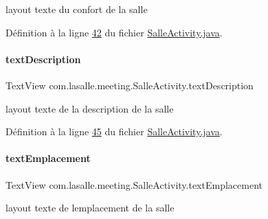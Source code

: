 layout texte du confort de la salle 



Définition à la ligne \hyperlink{_salle_activity_8java_source_l00042}{42} du fichier \hyperlink{_salle_activity_8java_source}{Salle\+Activity.\+java}.

\mbox{\label{classcom_1_1lasalle_1_1meeting_1_1_salle_activity_acc3b8d915861076b132cdc33f4d9f298}} 
\paragraph{\texorpdfstring{text\+Description}{textDescription}}
{\footnotesize\ttfamily Text\+View com.\+lasalle.\+meeting.\+Salle\+Activity.\+text\+Description\hspace{0.3cm}{\ttfamily [private]}}



layout texte de la description de la salle 



Définition à la ligne \hyperlink{_salle_activity_8java_source_l00045}{45} du fichier \hyperlink{_salle_activity_8java_source}{Salle\+Activity.\+java}.

\mbox{\label{classcom_1_1lasalle_1_1meeting_1_1_salle_activity_a3e7b6e7c522546e84409d3b658985ca8}} 
\paragraph{\texorpdfstring{text\+Emplacement}{textEmplacement}}
{\footnotesize\ttfamily Text\+View com.\+lasalle.\+meeting.\+Salle\+Activity.\+text\+Emplacement\hspace{0.3cm}{\ttfamily [private]}}



layout texte de l\textquotesingle{}emplacement de la salle 



